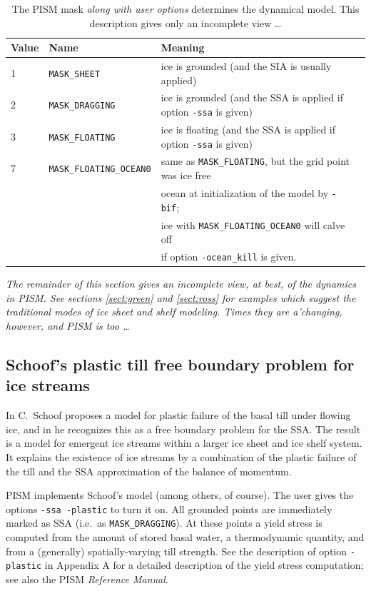 \documentclass[11pt,final]{amsart}
\newcommand{\pismoptionindex}[1]{\index{options for PISM (and PETSc)!\texttt{-#1}}}
\newcommand{\intextoption}[1]{\texttt{-#1}\pismoptionindex{#1}}
\begin{document}
\begin{table}[ht]
\caption{The PISM mask \emph{along with user options} determines the dynamical model.  This description gives only an incomplete view \dots}\label{tab:maskvals} 
\small
\begin{tabular}{@{}llll}\hline
\textbf{Value} & \textbf{Name} & \textbf{Meaning}\\ \hline
1 & \verb|MASK_SHEET| & ice is grounded (and the SIA is usually applied) \\
2 & \verb|MASK_DRAGGING| & ice is grounded (and the SSA is applied if option \verb|-ssa| is given) \\
3 & \verb|MASK_FLOATING| & ice is floating (and the SSA is applied if option \verb|-ssa| is given) \\
7 & \verb|MASK_FLOATING_OCEAN0| & same as \verb|MASK_FLOATING|, but the grid point was ice free   \\
 & & ocean at initialization of the model by \verb|-bif|;  \\
 & & ice with \verb|MASK_FLOATING_OCEAN0| will calve off  \\
 & & if option \verb|-ocean_kill| is given.\\
\hline\end{tabular}
\normalsize
\end{table}

\emph{The remainder of this section gives an incomplete view, at best, of the dynamics in PISM.  See sections \ref{sect:green} and \ref{sect:ross} for examples which suggest the traditional modes of ice sheet and shelf modeling.  Times they are a'changing, however, and PISM is too \dots}


\subsection{Schoof's plastic till free boundary problem for ice streams} \label{subsect:plastic}    In \cite{SchoofTill} C.~Schoof proposes a model for plastic failure of the basal till under flowing ice, and in \cite{SchoofStream} he recognizes this as a free boundary problem for the SSA.  The result is a model for emergent ice streams within a larger ice sheet and ice shelf system.  It explains the existence of ice streams by a combination of the plastic failure of the till and the SSA approximation of the balance of momentum.

PISM implements Schoof's model (among others, of course).  The user gives the options \verb|-ssa -plastic| to turn it on.  All grounded points are immediately marked as SSA (i.e.~as \verb|MASK_DRAGGING|).  At these points a yield stress is computed from the amount of stored basal water, a thermodynamic quantity, and from a (generally) spatially-varying till strength.  See the description of option \intextoption{plastic} in Appendix A for a detailed description of the yield stress computation; see also the PISM \emph{Reference Manual}.
\end{document}
